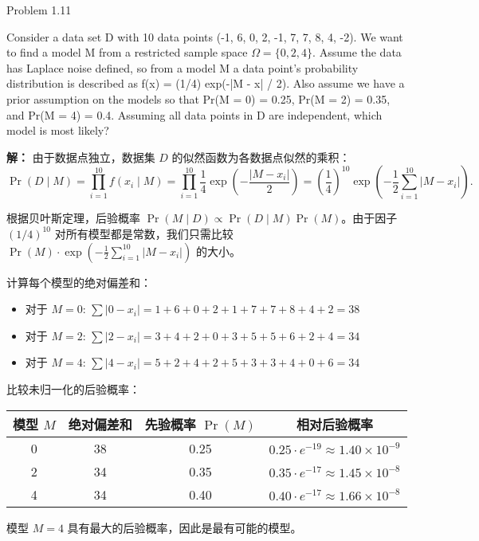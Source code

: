 \documentclass[12pt,a4paper]{article}
\newenvironment{exercise}[2][]
  {\begin{exercisebox}[#1]{#2}\ignorespaces}
  {\end{exercisebox}}
\newenvironment{problem}
  {\begin{problemnobox}\ignorespaces}
  {\end{problemnobox}}
\newenvironment{solution}
  {\par\noindent\textbf{\color{SolutionColor}解：}\ignorespaces}
  {}
\begin{document}
\begin{exercise}{Problem 1.11}
\begin{problem}
    Consider a data set D with 10 data points (-1, 6, 0, 2, -1, 7, 7, 8, 4, -2). We want to find a model M from a restricted sample space \(\Omega = \{0, 2, 4\}\). Assume the data has Laplace noise defined, so from a model M a data point's probability distribution is described as f(x) = (1/4) exp(-|M - x| / 2). Also assume we have a prior assumption on the models so that Pr(M = 0) = 0.25, Pr(M = 2) = 0.35, and Pr(M = 4) = 0.4. Assuming all data points in D are independent, which model is most likely?
\end{problem}
\begin{solution}
由于数据点独立，数据集 $D$ 的似然函数为各数据点似然的乘积：
\[
\Pr(D \mid M) = \prod_{i=1}^{10} f(x_i \mid M) = \prod_{i=1}^{10} \frac{1}{4} \exp\left( -\frac{|M - x_i|}{2} \right) = \left( \frac{1}{4} \right)^{10} \exp\left( -\frac{1}{2} \sum_{i=1}^{10} |M - x_i| \right).
\]

根据贝叶斯定理，后验概率 $\Pr(M \mid D) \propto \Pr(D \mid M) \Pr(M)$。由于因子 $(1/4)^{10}$ 对所有模型都是常数，我们只需比较 $\Pr(M) \cdot \exp\left( -\frac{1}{2} \sum_{i=1}^{10} |M - x_i| \right)$ 的大小。

计算每个模型的绝对偏差和：
\begin{itemize}
    \item 对于 $M = 0$: $\sum |0 - x_i| = 1+6+0+2+1+7+7+8+4+2 = 38$
    \item 对于 $M = 2$: $\sum |2 - x_i| = 3+4+2+0+3+5+5+6+2+4 = 34$
    \item 对于 $M = 4$: $\sum |4 - x_i| = 5+2+4+2+5+3+3+4+0+6 = 34$
\end{itemize}

比较未归一化的后验概率：
\begin{center}
\begin{tabular}{cccc}
\toprule
模型 $M$ & 绝对偏差和 & 先验概率 $\Pr(M)$ & 相对后验概率 \\
\midrule
0 & 38 & 0.25 & $0.25 \cdot e^{-19} \approx 1.40 \times 10^{-9}$ \\
2 & 34 & 0.35 & $0.35 \cdot e^{-17} \approx 1.45 \times 10^{-8}$ \\
4 & 34 & 0.40 & $0.40 \cdot e^{-17} \approx 1.66 \times 10^{-8}$ \\
\bottomrule
\end{tabular}
\end{center}

模型 $M=4$ 具有最大的后验概率，因此是最有可能的模型。

\end{solution}
\end{exercise}
\end{document}
